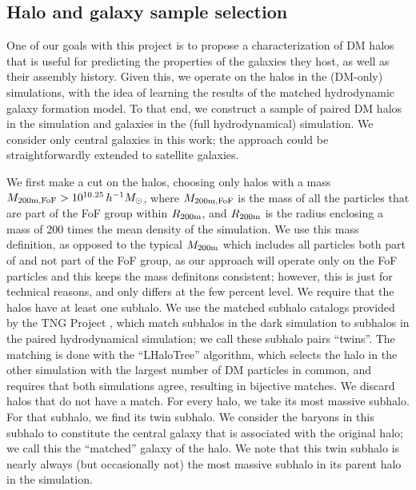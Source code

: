 \subsection{Halo and galaxy sample selection}
\label{sec:select}

One of our goals with this project is to propose a characterization of DM halos that is useful for predicting the properties of the galaxies they host, as well as their assembly history.
Given this, we operate on the halos in the \dark (DM-only) simulations, with the idea of learning the results of the matched hydrodynamic galaxy formation model.
To that end, we construct a sample of paired DM halos in the \dark simulation and galaxies in the \hydro (full hydrodynamical) simulation. 
We consider only central galaxies in this work; the approach could be straightforwardly extended to satellite galaxies.

We first make a cut on the \dark halos, choosing only halos with a mass $M_\mathrm{200m,FoF} > 10^{10.25} \, h^{-1} M_\mathrm{\odot}$, where $M_\mathrm{200m,FoF}$ is the mass of all the particles that are part of the FoF group within $R_\mathrm{200m}$, and $R_\mathrm{200m}$ is the radius enclosing a mass of 200 times the mean density of the simulation.
We use this mass definition, as opposed to the typical $M_\mathrm{200m}$ which includes all particles both part of and not part of the FoF group, as our approach will operate only on the FoF particles and this keeps the mass definitons consistent; however, this is just for technical reasons, and only differs at the few percent level.
We require that the halos have at least one subhalo.
We use the matched subhalo catalogs provided by the TNG Project \citep{rodriguez-gomez_merger_2015}, which match subhalos in the dark simulation to subhalos in the paired hydrodynamical simulation; we call these subhalo pairs ``twins''.
The matching is done with the ``LHaloTree'' algorithm, which selects the halo in the other simulation with the largest number of DM particles in common, and requires that both simulations agree, resulting in bijective matches.
We discard halos that do not have a \hydro match.
For every \dark halo, we take its most massive \dark subhalo.
For that \dark subhalo, we find its twin \hydro subhalo.
We consider the baryons in this subhalo to constitute the central galaxy that is associated with the original \dark halo; we call this the ``matched'' galaxy of the \dark halo. 
We note that this twin \hydro subhalo is nearly always (but occasionally not) the most massive subhalo in its parent halo in the \hydro simulation.

